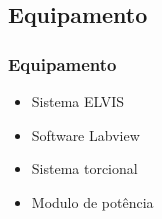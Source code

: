 \documentclass{beamer}
\begin{document}
\subsection{Equipamento}
\begin{frame}
	\frametitle{Equipamento}
	\begin{itemize}
		\item Sistema ELVIS
		\item Software Labview
		\item Sistema torcional
		\item Modulo de potência
	\end{itemize}
	
	\begin{center}
	\end{center}

\end{frame}
\end{document}
